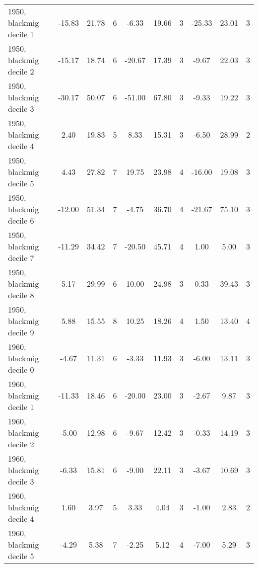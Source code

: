 \begin{table}[htbp]
\begin{tabular}{l*{3}{ccc}}
1950, blackmig decile 1&      -15.83&       21.78&           6&       -6.33&       19.66&           3&      -25.33&       23.01&           3\\
1950, blackmig decile 2&      -15.17&       18.74&           6&      -20.67&       17.39&           3&       -9.67&       22.03&           3\\
1950, blackmig decile 3&      -30.17&       50.07&           6&      -51.00&       67.80&           3&       -9.33&       19.22&           3\\
1950, blackmig decile 4&        2.40&       19.83&           5&        8.33&       15.31&           3&       -6.50&       28.99&           2\\
1950, blackmig decile 5&        4.43&       27.82&           7&       19.75&       23.98&           4&      -16.00&       19.08&           3\\
1950, blackmig decile 6&      -12.00&       51.34&           7&       -4.75&       36.70&           4&      -21.67&       75.10&           3\\
1950, blackmig decile 7&      -11.29&       34.42&           7&      -20.50&       45.71&           4&        1.00&        5.00&           3\\
1950, blackmig decile 8&        5.17&       29.99&           6&       10.00&       24.98&           3&        0.33&       39.43&           3\\
1950, blackmig decile 9&        5.88&       15.55&           8&       10.25&       18.26&           4&        1.50&       13.40&           4\\
1960, blackmig decile 0&       -4.67&       11.31&           6&       -3.33&       11.93&           3&       -6.00&       13.11&           3\\
1960, blackmig decile 1&      -11.33&       18.46&           6&      -20.00&       23.00&           3&       -2.67&        9.87&           3\\
1960, blackmig decile 2&       -5.00&       12.98&           6&       -9.67&       12.42&           3&       -0.33&       14.19&           3\\
1960, blackmig decile 3&       -6.33&       15.81&           6&       -9.00&       22.11&           3&       -3.67&       10.69&           3\\
1960, blackmig decile 4&        1.60&        3.97&           5&        3.33&        4.04&           3&       -1.00&        2.83&           2\\
1960, blackmig decile 5&       -4.29&        5.38&           7&       -2.25&        5.12&           4&       -7.00&        5.29&           3\\

\end{tabular}
\end{table}
